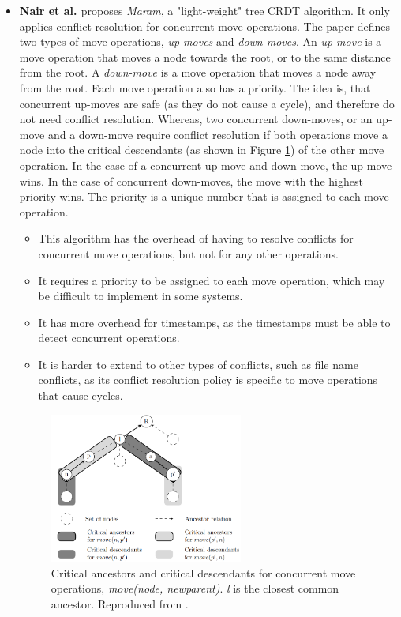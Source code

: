 \documentclass[12pt]{report}
\begin{document}
\begin{itemize}
    \item
          \textbf{Nair et al. \cite{https://doi.org/10.48550/arxiv.2103.04828}} proposes \textit{Maram}, a "light-weight" tree CRDT algorithm. It only applies conflict resolution for concurrent move operations. The paper defines two types of move operations, \textit{up-moves} and \textit{down-moves}. An \textit{up-move} is a move operation that moves a node towards the root, or to the same distance from the root. A \textit{down-move} is a move operation that moves a node away from the root. Each move operation also has a priority. The idea is, that concurrent up-moves are safe (as they do not cause a cycle), and therefore do not need conflict resolution. Whereas, two concurrent down-moves, or an up-move and a down-move require conflict resolution if both operations move a node into the critical descendants (as shown in Figure \ref{fig:maram}) of the other move operation. In the case of a concurrent up-move and down-move, the up-move wins. In the case of concurrent down-moves, the move with the highest priority wins. The priority is a unique number that is assigned to each move operation.
          \begin{itemize}
            \item This algorithm has the overhead of having to resolve conflicts for concurrent move operations, but not for any other operations. \par
            \item It requires a priority to be assigned to each move operation, which may be difficult to implement in some systems. \par
            \item It has more overhead for timestamps, as the timestamps must be able to detect concurrent operations. \par
            \item It is harder to extend to other types of conflicts, such as file name conflicts, as its conflict resolution policy is specific to move operations that cause cycles. \par
          \end{itemize}
          

\begin{figure}[H]
    \centering
    \includegraphics[width=0.6\textwidth]{maram.png}
    \caption{Critical ancestors and critical descendants for concurrent move operations, \textit{move(node, newparent)}. \textit{l} is the closest common ancestor. Reproduced from \cite{https://doi.org/10.48550/arxiv.2103.04828}.}
    \label{fig:maram}
\end{figure}


\end{itemize}
\end{document}
